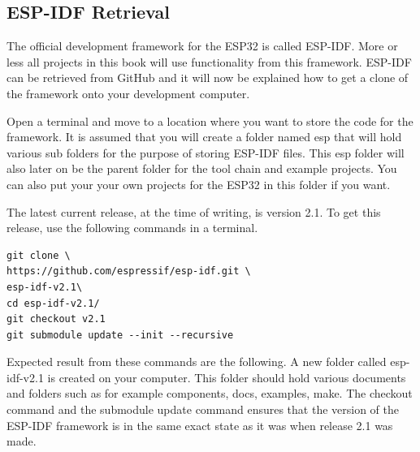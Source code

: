 \documentclass{tufte-book}
\begin{document}
\subsection{ESP-IDF Retrieval}


The official development framework for the ESP32 is called ESP-IDF. More or less all projects in this book will use functionality from this framework. ESP-IDF can be retrieved from GitHub and it will now be explained how to get a clone of the framework onto your development computer.

Open a terminal and move to a location where you want to store the code for the framework. It is assumed that you will create a folder named esp that will hold various sub folders for the purpose of storing ESP-IDF files. This esp folder will also later on be the parent folder for the tool chain and example projects. You can also put your your own projects for the ESP32 in this folder if you want.


The latest current release, at the time of writing, is version 2.1. To get this release, use the following commands in a terminal.

\begin{lstlisting}
git clone \
https://github.com/espressif/esp-idf.git \
esp-idf-v2.1\ 
cd esp-idf-v2.1/
git checkout v2.1
git submodule update --init --recursive
\end{lstlisting}


Expected result from these commands are the following. A new folder called esp-idf-v2.1 is created on your computer. This folder should hold various documents and folders such as for example components, docs, examples, make. The checkout command and the submodule update command ensures that the version of the ESP-IDF framework is in the same exact state as it was when release 2.1 was made.
\end{document}
